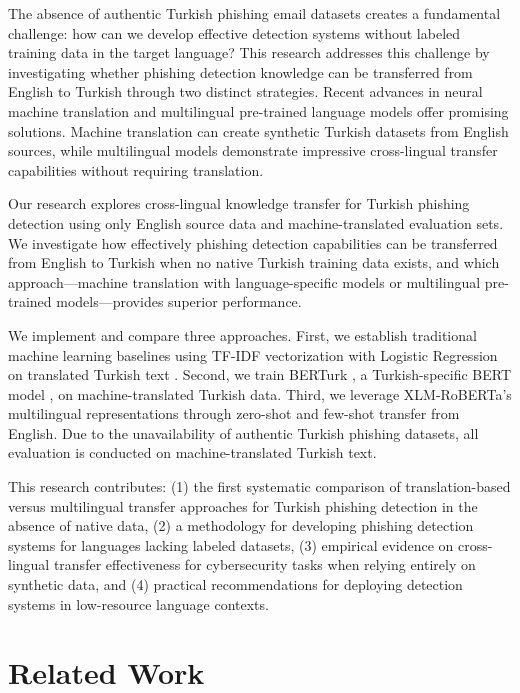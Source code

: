 \documentclass[conference]{IEEEtran}
\begin{document}
The absence of authentic Turkish phishing email datasets creates a fundamental challenge: how can we develop effective detection systems without labeled training data in the target language? This research addresses this challenge by investigating whether phishing detection knowledge can be transferred from English to Turkish through two distinct strategies. Recent advances in neural machine translation \cite{1} and multilingual pre-trained language models \cite{9,10} offer promising solutions. Machine translation can create synthetic Turkish datasets from English sources, while multilingual models demonstrate impressive cross-lingual transfer capabilities without requiring translation.

Our research explores cross-lingual knowledge transfer for Turkish phishing detection using only English source data and machine-translated evaluation sets. We investigate how effectively phishing detection capabilities can be transferred from English to Turkish when no native Turkish training data exists, and which approach—machine translation with language-specific models or multilingual pre-trained models—provides superior performance.

We implement and compare three approaches. First, we establish traditional machine learning baselines using TF-IDF vectorization with Logistic Regression on translated Turkish text \cite{4,5}. Second, we train BERTurk \cite{6}, a Turkish-specific BERT model \cite{2}, on machine-translated Turkish data. Third, we leverage XLM-RoBERTa's \cite{3} multilingual representations through zero-shot and few-shot transfer from English. Due to the unavailability of authentic Turkish phishing datasets, all evaluation is conducted on machine-translated Turkish text.

This research contributes: (1) the first systematic comparison of translation-based versus multilingual transfer approaches for Turkish phishing detection in the absence of native data, (2) a methodology for developing phishing detection systems for languages lacking labeled datasets, (3) empirical evidence on cross-lingual transfer effectiveness for cybersecurity tasks when relying entirely on synthetic data, and (4) practical recommendations for deploying detection systems in low-resource language contexts.

\section{Related Work}
\end{document}
